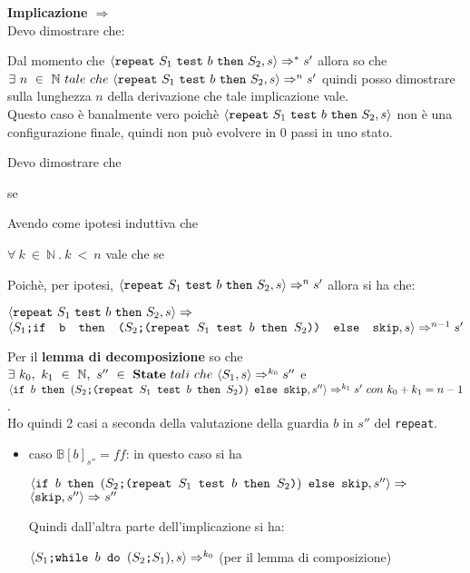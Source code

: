 {	\textbf{Implicazione $\Longrightarrow$}\\
	Devo dimostrare che:
	\begin{center}
	\exThreeLtR{}
	\end{center}
	Dal momento che $\confSs{\repeatSbS{S_1}{b}{S_2}}{s}\Rar{*}s'$ allora so che
	$\exists{}~n~\in~\mathbb{N}~tale~che~
	\confSs{\repeatSbS{S_1}{b}{S_2}}{s}\Rar{n}s'$ quindi posso dimostrare sulla
	lunghezza $n$ della derivazione che tale implicazione vale.\\

	 Questo caso è banalmente vero poichè 
	$\confSs{\repeatSbS{S_1}{b}{S_2}}{s}$ non è una configurazione finale,
	quindi non può evolvere in 0 passi in uno stato.
	
	 Devo dimostrare che 
	\begin{center}
	se 
	\end{center}
	Avendo come ipotesi induttiva che 
	\begin{center}
	$\forall{}~k~\in~\mathbb{N}~.~k~<~n$ vale che se 
	\end{center}
	Poichè, per ipotesi, $\confSs{\repeatSbS{S_1}{b}{S_2}}{s}\Rar{n}s'$ allora
	si ha che:
	\begin{center}
	$\confSs{\repeatSbS{S_1}{b}{S_2}}{s}\Rar{}$\\
	$\confSs{\concat{$S_1$}{\ifABC{b}{(\concat{$S_2$}
	{(\repeatSbS{$S_1$}{$b$}{$S_2$})})}{\skipistr}}}{s}\Rar{n-1}s'$
	\end{center}
	Per il \textbf{lemma di decomposizione} so che $\exists{}~k_0,~k_1~\in~
	\mathbb{N},~s''~\in~\states{}~tali~che~\confSs{S_1}{s}\Rar{k_0}s''$ e \\
	$\confSs{\ifABC{b}{(\concat{$S_2$}{(\repeatSbS{$S_1$}{$b$}{$S_2$})})}
	{\skipistr}}{s''}\Rar{k_1}s'~con~k_0+k_1=n-1$.\\
	Ho quindi 2 casi a seconda della valutazione della guardia $b$ in $s''$ del
	\texttt{repeat}.
	\begin{itemize}
		\item caso $\mathbb{B}[b]_{s''}=ff$: in questo caso si ha 
		\begin{center}
		$\confSs{\ifABC{b}{(\concat{$S_2$}{(\repeatSbS{$S_1$}{$b$}{$S_2$})})}
		{\skipistr}}{s''}\Rar{}$\\
		$\confSs{\skipistr}{s''}\Rar{}s''$
		\end{center}
		Quindi dall'altra parte dell'implicazione si ha:
		\begin{center}
		$\confSs{\PDef{}}{s}\Rar{k_0}$ (per il lemma di composizione)\\

\end{center}
\end{itemize}}
